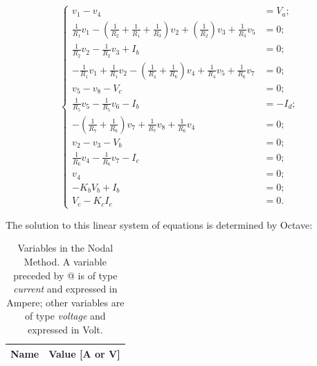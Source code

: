 \begin{equation}
\begin{cases}
	v_1 - v_4 &= V_a;																				  \\
	\frac{1}{R_1}v_1 - (\frac{1}{R_2}+\frac{1}{R_1}+\frac{1}{R_3})v_2 + (\frac{1}{R_2})v_3 + \frac{1}{R_3}v_5 &= 0; \\
  	\frac{1}{R_2}v_2 - \frac{1}{R_2}v_3+ I_b &= 0;													  \\
  	-\frac{1}{R_1}v_1 + \frac{1}{R_1}v_2 - (\frac{1}{R_4}+\frac{1}{R_6})v_4 + \frac{1}{R_4}v_5 + \frac{1}{R_6}v_7 &= 0;			  																	  \\
	v_5 - v_8 - V_c &= 0;																			  \\
  	\frac{1}{R_5}v_5 - \frac{1}{R_5}v_6 - I_b &= -I_d;												  \\
  	-(\frac{1}{R_7}+\frac{1}{R_6})v_7 + \frac{1}{R_7}v_8 + \frac{1}{R_6}v_4 &= 0;					  \\
	v_2 - v_3 - V_b &= 0;																			  \\
  	\frac{1}{R_6}v_4 - \frac{1}{R_6}v_7 - I_c &= 0;													  \\
  	v_4 &= 0;																						  \\
  	-K_bV_b + I_b &= 0;																				  \\
  	V_c - K_cI_c &= 0.
\end{cases}
\end{equation}

The solution to this linear system of equations is determined by Octave:

\begin{table}[h]
  \centering
  \begin{tabular}{|l|r|}
  \hline  
    {\bf Name} & {\bf Value [A or V]} \\ \hline
    
  \end{tabular}
  \caption{Variables in the Nodal Method. A variable preceded by @ is of type {\em current} and expressed in Ampere; other variables are of type {\em voltage} and expressed in Volt.}
  \label{tab:nos}
\end{table}

